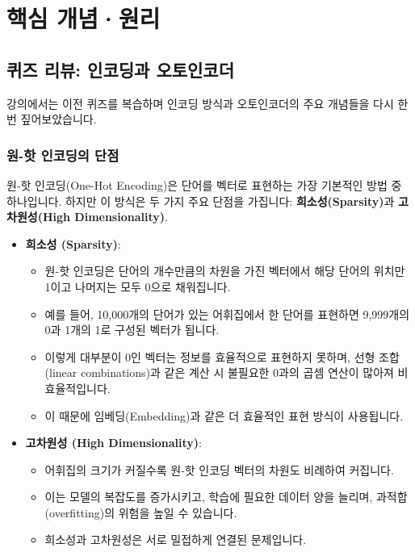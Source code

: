 \documentclass[11pt,a4paper]{article}
\begin{document}
\newpage
\section*{핵심 개념·원리}

\subsection*{퀴즈 리뷰: 인코딩과 오토인코더}
강의에서는 이전 퀴즈를 복습하며 인코딩 방식과 오토인코더의 주요 개념들을 다시 한번 짚어보았습니다.

\subsubsection*{원-핫 인코딩의 단점}
\begin{conceptbox}
원-핫 인코딩(One-Hot Encoding)은 단어를 벡터로 표현하는 가장 기본적인 방법 중 하나입니다.
하지만 이 방식은 두 가지 주요 단점을 가집니다: \textbf{희소성(Sparsity)}과 \textbf{고차원성(High Dimensionality)}.
\end{conceptbox}

\begin{itemize}
    \item \textbf{희소성 (Sparsity)}:
    \begin{itemize}
        \item 원-핫 인코딩은 단어의 개수만큼의 차원을 가진 벡터에서 해당 단어의 위치만 1이고 나머지는 모두 0으로 채워집니다.
        \item 예를 들어, 10,000개의 단어가 있는 어휘집에서 한 단어를 표현하면 9,999개의 0과 1개의 1로 구성된 벡터가 됩니다.
        \item 이렇게 대부분이 0인 벡터는 정보를 효율적으로 표현하지 못하며, 선형 조합(linear combinations)과 같은 계산 시 불필요한 0과의 곱셈 연산이 많아져 비효율적입니다.
        \item 이 때문에 임베딩(Embedding)과 같은 더 효율적인 표현 방식이 사용됩니다.
    \end{itemize}
    \item \textbf{고차원성 (High Dimensionality)}:
    \begin{itemize}
        \item 어휘집의 크기가 커질수록 원-핫 인코딩 벡터의 차원도 비례하여 커집니다.
        \item 이는 모델의 복잡도를 증가시키고, 학습에 필요한 데이터 양을 늘리며, 과적합(overfitting)의 위험을 높일 수 있습니다.
        \item 희소성과 고차원성은 서로 밀접하게 연결된 문제입니다.
    \end{itemize}
\end{itemize}
\end{document}

